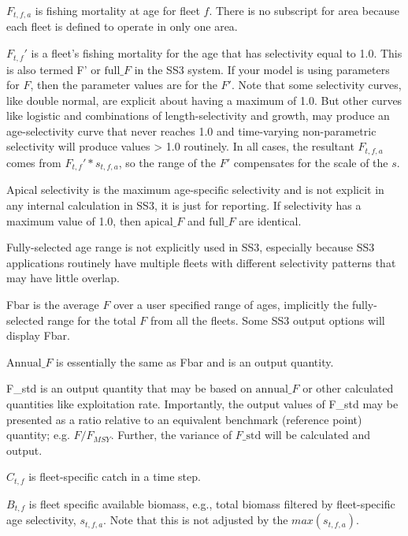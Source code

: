 $F_{t,f,a}$ is fishing mortality at age for fleet $f$. There is no subscript for area because each fleet is defined to operate in only one area.

$F_{t,f}'$ is a fleet's fishing mortality for the age that has selectivity equal to 1.0. This is also termed F' or $\text{full\_}F$ in the SS3 system. If your model is using parameters for $F$, then the parameter values are for the $F'$. Note that some selectivity curves, like double normal, are explicit about having a maximum of 1.0. But other curves like logistic and combinations of length-selectivity and growth, may produce an age-selectivity curve that never reaches 1.0 and time-varying non-parametric selectivity will produce values > 1.0 routinely. In all cases, the resultant $F_{t,f,a}$ comes from $F_{t,f}' * s_{t,f,a}$, so the range of the $F'$ compensates for the scale of the $s$.

Apical selectivity is the maximum age-specific selectivity and is not explicit in any internal calculation in SS3, it is just for reporting. If selectivity has a maximum value of 1.0, then $\text{apical\_}F$ and $\text{full\_}F$ are identical.

Fully-selected age range is not explicitly used in SS3, especially because SS3 applications routinely have multiple fleets with different selectivity patterns that may have little overlap.

Fbar is the average $F$ over a user specified range of ages, implicitly the fully-selected range for the total $F$ from all the fleets. Some SS3 output options will display Fbar.

$\text{Annual\_}F$ is essentially the same as Fbar and is an output quantity.

F\_std is an output quantity that may be based on $\text{annual\_}F$ or other calculated quantities like exploitation rate. Importantly, the output values of F\_std may be presented as a ratio relative to an equivalent benchmark (reference point) quantity; e.g. $F / F_{MSY}$. Further, the variance of $F\text{\_std}$ will be calculated and output.

$C_{t,f}$ is fleet-specific catch in a time step.

$B_{t,f}$ is fleet specific available biomass, e.g., total biomass filtered by fleet-specific age selectivity, $s_{t,f,a}$. Note that this is not adjusted by the $max(s_{t,f,a})$.


